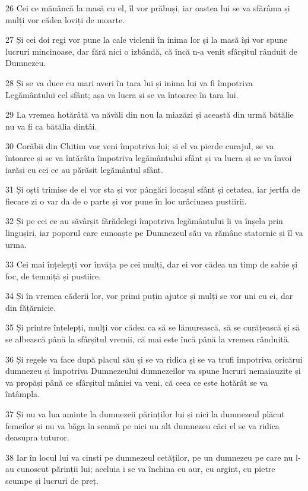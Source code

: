 \par 26 Cei ce mănâncă la masă cu el, îl vor prăbuși, iar oastea lui se va sfărâma și mulți vor cădea loviți de moarte.
\par 27 Și cei doi regi vor pune la cale viclenii în inima lor și la masă își vor spune lucruri mincinoase, dar fără nici o izbândă, că încă n-a venit sfârșitul rânduit de Dumnezeu.
\par 28 Și se va duce cu mari averi în țara lui și inima lui va fi împotriva Legământului cel sfânt; așa va lucra și se va întoarce în țara lui.
\par 29 La vremea hotărâtă va năvăli din nou la miazăzi și această din urmă bătălie nu va fi ca bătălia dintâi.
\par 30 Corăbii din Chitim vor veni împotriva lui; și el va pierde curajul, se va întoarce și se va întărâta împotriva legământului sfânt și va lucra și se va învoi iarăși cu cei ce au părăsit legământul sfânt.
\par 31 Și oști trimise de el vor sta și vor pângări locașul sfânt și cetatea, iar jertfa de fiecare zi o var da de o parte și vor pune în loc urâciunea pustiirii.
\par 32 Și pe cei ce au săvârșit fărădelegi împotriva legământului îi va înșela prin lingușiri, iar poporul care cunoaște pe Dumnezeul său va rămâne statornic și îl va urma.
\par 33 Cei mai înțelepți vor învăța pe cei mulți, dar ei vor cădea un timp de sabie și foc, de temniță și pustiire.
\par 34 Și în vremea căderii lor, vor primi puțin ajutor și mulți se vor uni cu ei, dar din fățărnicie.
\par 35 Și printre înțelepți, mulți vor cădea ca să se lămurească, să se curățească și să se albească până la sfârșitul vremii, că mai este încă până la vremea rânduită.
\par 36 Și regele va face după placul său și se va ridica și se va trufi împotriva oricărui dumnezeu și împotriva Dumnezeului dumnezeilor va spune lucruri nemaiauzite și va propăși până ce sfârșitul mâniei va veni, că ceea ce este hotărât se va întâmpla.
\par 37 Și nu va lua aminte la dumnezeii părinților lui și nici la dumnezeul plăcut femeilor și nu va băga în seamă pe nici un alt dumnezeu căci el se va ridica deasupra tuturor.
\par 38 Iar în locul lui va cinsti pe dumnezeul cetăților, pe un dumnezeu pe care nu l-au cunoscut părinții lui; aceluia i se va închina cu aur, cu argint, cu pietre scumpe și lucruri de preț.
